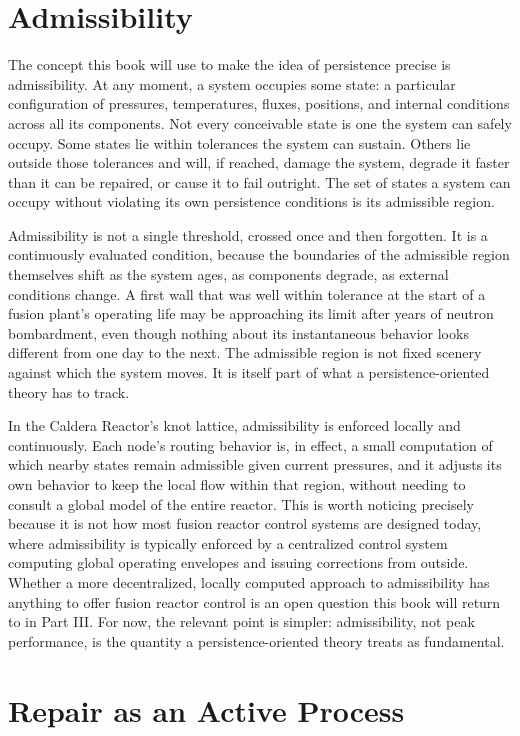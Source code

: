 \section{Admissibility}

The concept this book will use to make the idea of persistence precise is admissibility. At any moment, a system occupies some state: a particular configuration of pressures, temperatures, fluxes, positions, and internal conditions across all its components. Not every conceivable state is one the system can safely occupy. Some states lie within tolerances the system can sustain. Others lie outside those tolerances and will, if reached, damage the system, degrade it faster than it can be repaired, or cause it to fail outright. The set of states a system can occupy without violating its own persistence conditions is its admissible region.

Admissibility is not a single threshold, crossed once and then forgotten. It is a continuously evaluated condition, because the boundaries of the admissible region themselves shift as the system ages, as components degrade, as external conditions change. A first wall that was well within tolerance at the start of a fusion plant's operating life may be approaching its limit after years of neutron bombardment, even though nothing about its instantaneous behavior looks different from one day to the next. The admissible region is not fixed scenery against which the system moves. It is itself part of what a persistence-oriented theory has to track.

In the Caldera Reactor's knot lattice, admissibility is enforced locally and continuously. Each node's routing behavior is, in effect, a small computation of which nearby states remain admissible given current pressures, and it adjusts its own behavior to keep the local flow within that region, without needing to consult a global model of the entire reactor. This is worth noticing precisely because it is not how most fusion reactor control systems are designed today, where admissibility is typically enforced by a centralized control system computing global operating envelopes and issuing corrections from outside. Whether a more decentralized, locally computed approach to admissibility has anything to offer fusion reactor control is an open question this book will return to in Part III. For now, the relevant point is simpler: admissibility, not peak performance, is the quantity a persistence-oriented theory treats as fundamental.

\section{Repair as an Active Process}


